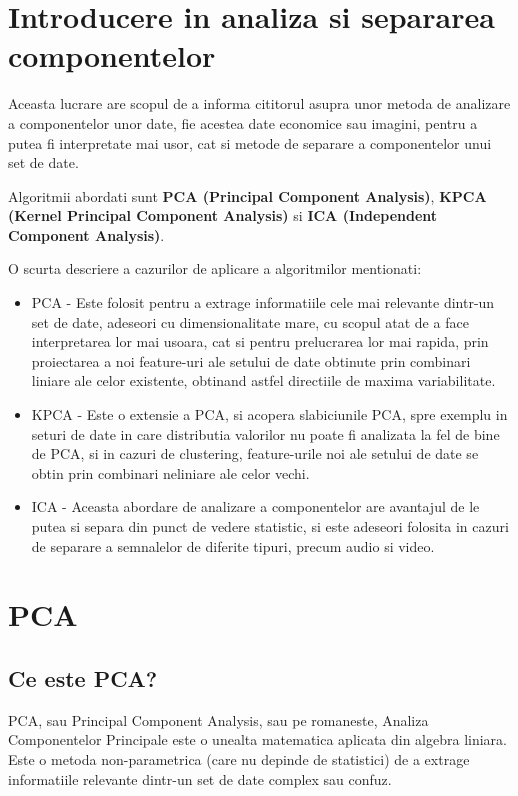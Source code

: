 \documentclass[12pt,oneside]{article}
\begin{document}
\pagestyle{plain}

\newpage
\setcounter{page}{1}
\tableofcontents
\clearpage

\newpage

\pagestyle{plain}
\section{Introducere in analiza si separarea componentelor}
Aceasta lucrare are scopul de a informa cititorul asupra unor metoda de analizare a componentelor unor date, fie acestea date economice sau imagini, pentru a putea fi interpretate mai usor, cat si metode de separare a componentelor unui set de date. 

Algoritmii abordati sunt \textbf{PCA (Principal Component Analysis)}, \textbf{KPCA (Kernel Principal Component Analysis)} si \textbf{ICA (Independent Component Analysis)}. 

O scurta descriere a cazurilor de aplicare a algoritmilor mentionati:
\begin{itemize}
	\item{PCA - Este folosit pentru a extrage informatiile cele mai relevante dintr-un set de date, adeseori cu dimensionalitate mare, cu scopul atat de a face interpretarea lor mai usoara, cat si pentru prelucrarea lor mai rapida, prin proiectarea a noi feature-uri ale setului de date obtinute prin combinari liniare ale celor existente, obtinand astfel directiile de maxima variabilitate.}
	\item{KPCA - Este o extensie a PCA, si acopera slabiciunile PCA, spre exemplu in seturi de date in care distributia valorilor nu poate fi analizata la fel de bine de PCA, si in cazuri de clustering, feature-urile noi ale setului de date se obtin prin combinari neliniare ale celor vechi.}
	\item{ICA - Aceasta abordare de analizare a componentelor are avantajul de le putea si separa din punct de vedere statistic, si este adeseori folosita in cazuri de separare a semnalelor de diferite tipuri, precum audio si video.}
\end{itemize}

\newpage

\section{PCA}

\subsection{Ce este PCA?}
PCA, sau Principal Component Analysis, sau pe romaneste, Analiza Componentelor Principale este o unealta matematica aplicata din algebra liniara. Este o metoda non-parametrica (care nu depinde de statistici) de a extrage informatiile relevante dintr-un set de date complex sau confuz.\cite{data_reduction}
\end{document}
